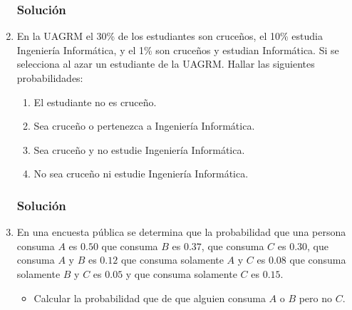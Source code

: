 \begin{enumerate}
\subsubsection{Solución}
\item En la UAGRM el 30\% de los estudiantes son cruceños, el 10\% estudia Ingeniería Informática, y el 1\% son cruceños y estudian Informática. Si se selecciona al azar un estudiante de la UAGRM. Hallar las siguientes probabilidades:
\begin{enumerate}
\item El estudiante no es cruceño.
\item Sea cruceño o pertenezca a Ingeniería Informática.
\item Sea cruceño y no estudie Ingeniería Informática.
\item No sea cruceño ni estudie Ingeniería Informática.
\end{enumerate}
\subsubsection{Solución}
\item En una encuesta pública se determina que la probabilidad que una persona consuma $A$ es $0.50$ que consuma $B$ es $0.37$, que consuma $C$ es $0.30$, que consuma $A$ y $B$ es $0.12$ que consuma solamente $A$ y $C$ es $0.08$ que consuma solamente $B$ y $C$ es $0.05$ y que consuma solamente $C$ es $0.15$.
\begin{itemize}
\item Calcular la probabilidad que de que alguien consuma $A$ o $B$ pero no $C$.
\end{itemize}

\end{enumerate}
